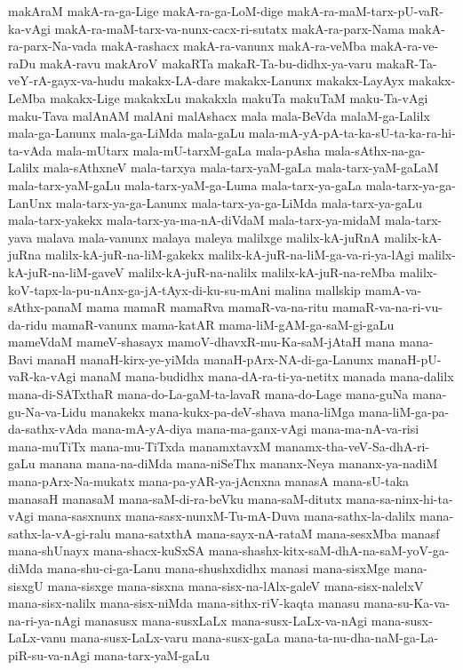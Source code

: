 {makAraM
makA-ra-ga-Lige
makA-ra-ga-LoM-dige
makA-ra-maM-tarx-pU-vaR-ka-vAgi
makA-ra-maM-tarx-va-nunx-cacx-ri-sutatx
makA-ra-parx-Nama
makA-ra-parx-Na-vada
makA-rashacx
makA-ra-vanunx
makA-ra-veMba
makA-ra-ve-raDu
makA-ravu
makAroV
makaRTa
makaR-Ta-bu-didhx-ya-varu
makaR-Ta-veY-rA-gayx-va-hudu
makakx-LA-dare
makakx-Lanunx
makakx-LayAyx
makakx-LeMba
makakx-Lige
makakxLu
makakxla
makuTa
makuTaM
maku-Ta-vAgi
maku-Tava
malAnAM
malAni
malAshacx
mala
mala-BeVda
malaM-ga-Lalilx
mala-ga-Lanunx
mala-ga-LiMda
mala-gaLu
mala-mA-yA-pA-ta-ka-sU-ta-ka-ra-hi-ta-vAda
mala-mUtarx
mala-mU-tarxM-gaLa
mala-pAsha
mala-sAthx-na-ga-Lalilx
mala-sAthxneV
mala-tarxya
mala-tarx-yaM-gaLa
mala-tarx-yaM-gaLaM
mala-tarx-yaM-gaLu
mala-tarx-yaM-ga-Luma
mala-tarx-ya-gaLa
mala-tarx-ya-ga-LanUnx
mala-tarx-ya-ga-Lanunx
mala-tarx-ya-ga-LiMda
mala-tarx-ya-gaLu
mala-tarx-yakekx
mala-tarx-ya-ma-nA-diVdaM
mala-tarx-ya-midaM
mala-tarx-yava
malava
mala-vanunx
malaya
maleya
malilxge
malilx-kA-juRnA
malilx-kA-juRna
malilx-kA-juR-na-liM-gakekx
malilx-kA-juR-na-liM-ga-va-ri-ya-lAgi
malilx-kA-juR-na-liM-gaveV
malilx-kA-juR-na-nalilx
malilx-kA-juR-na-reMba
malilx-koV-tapx-la-pu-nAnx-ga-jA-tAyx-di-ku-su-mAni
malina
mallskip
mamA-va-sAthx-panaM
mama
mamaR
mamaRva
mamaR-va-na-ritu
mamaR-va-na-ri-vu-da-ridu
mamaR-vanunx
mama-katAR
mama-liM-gAM-ga-saM-gi-gaLu
mameVdaM
mameV-shasayx
mamoV-dhavxR-mu-Ka-saM-jAtaH
mana
mana-Bavi
manaH
manaH-kirx-ye-yiMda
manaH-pArx-NA-di-ga-Lanunx
manaH-pU-vaR-ka-vAgi
manaM
mana-budidhx
mana-dA-ra-ti-ya-netitx
manada
mana-dalilx
mana-di-SATxthaR
mana-do-La-gaM-ta-lavaR
mana-do-Lage
mana-guNa
mana-gu-Na-va-Lidu
manakekx
mana-kukx-pa-deV-shava
mana-liMga
mana-liM-ga-pa-da-sathx-vAda
mana-mA-yA-diya
mana-ma-ganx-vAgi
mana-ma-nA-va-risi
mana-muTiTx
mana-mu-TiTxda
manamxtavxM
manamx-tha-veV-Sa-dhA-ri-gaLu
manana
mana-na-diMda
mana-niSeThx
mananx-Neya
mananx-ya-nadiM
mana-pArx-Na-mukatx
mana-pa-yAR-ya-jAcnxna
manasA
mana-sU-taka
manasaH
manasaM
mana-saM-di-ra-beVku
mana-saM-ditutx
mana-sa-ninx-hi-ta-vAgi
mana-sasxnunx
mana-sasx-nunxM-Tu-mA-Duva
mana-sathx-la-dalilx
mana-sathx-la-vA-gi-ralu
mana-satxthA
mana-sayx-nA-rataM
mana-sesxMba
manasf
mana-shUnayx
mana-shacx-kuSxSA
mana-shashx-kitx-saM-dhA-na-saM-yoV-ga-diMda
mana-shu-ci-ga-Lanu
mana-shushxdidhx
manasi
mana-sisxMge
mana-sisxgU
mana-sisxge
mana-sisxna
mana-sisx-na-lAlx-galeV
mana-sisx-nalelxV
mana-sisx-nalilx
mana-sisx-niMda
mana-sithx-riV-kaqta
manasu
mana-su-Ka-va-na-ri-ya-nAgi
manasusx
mana-susxLaLx
mana-susx-LaLx-va-nAgi
mana-susx-LaLx-vanu
mana-susx-LaLx-varu
mana-susx-gaLa
mana-ta-nu-dha-naM-ga-La-piR-su-va-nAgi
mana-tarx-yaM-gaLu
}
